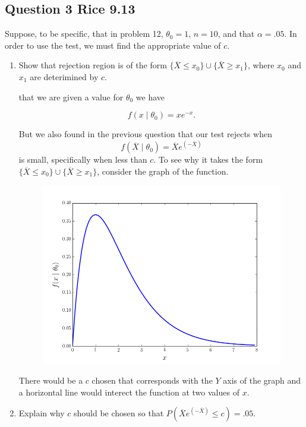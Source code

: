 \documentclass{tufte-book}
\theoremstyle{mytheoremstyle}
\theoremstyle{mylemstyle}
\theoremstyle{mydefstyle}
\begin{document}
\subsection{Question 3 Rice 9.13}
Suppose, to be specific, that in problem 12, $\theta_0=1$, $n=10$, and that $\alpha=.05$.  In order to use the test, we must find the appropriate value of $c$.
\begin{enumerate}

\item Show that rejection region is of the form $\{\overline{X} \leq x_0\} \cup \{ \overline{X} \geq x_1 \}$, where $x_0$ and $x_1$ are deterimined by $c$.

 that we are given a value for $\theta_0$ we have

\[ f(x\mid \theta_0) = xe^{-x}. \]

But we also found in the previous question that our test rejects when
\[ f(\overline{X} \mid \theta_0) = \overline{X} e^{(-\overline{X})} \]
is small, specifically when less than $c$.  To see why it takes the form
$\{\overline{X} \leq x_0\} \cup \{ \overline{X} \geq x_1 \}$, consider the graph of the function.

\begin{figure}
\includegraphics{q3}
\caption{}
\end{figure}

There would be a $c$ chosen that corresponds with the $Y$ axis of the graph and a horizontal line would interect the function at two values of $x$.

\item Explain why $c$ should be chosen so that $P(\overline{X} e^{(-\overline{X})} \leq c) = .05$.


\end{enumerate}
\end{document}
